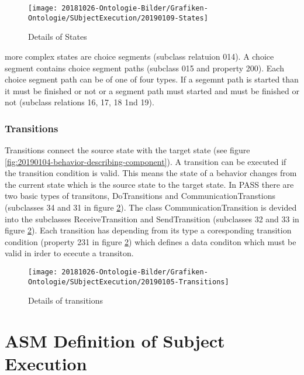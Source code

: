 \begin{figure}[ph]
	\centering
	\texttt{[image: 20181026-Ontologie-Bilder/Grafiken-Ontologie/SUbjectExecution/20190109-States]}
	\caption[Details of States]{Details of States}
	\label{fig:20190109-states}
\end{figure}

more complex states are choice segments (subclass relatuion 014). A choice segment contains choice segment paths (subclass 015 and property 200). Each choice segment path can be of one of four types. If a segemnt path is started than it must be finished or not or a segment path must started and must be finished or not (subclass relations 16, 17, 18 1nd 19).


\newpage

\subsubsection{Transitions}
Transitions connect the source state with the target state (see figure \ref{fig:20190104-behavior-describing-component}). A transition can be executed if the transition condition is valid. This means the state of a behavior changes from the current state which is the source state to the target state. In PASS there are two basic types of transitons, DoTransitions and CommunicationTranstions (subclasses 34 and 31 in figure \ref{fig:20190105-transitions}). The class CommunicationTransition is devided into the subclasses ReceiveTransition and SendTransition (subclasses 32 and 33 in figure \ref{fig:20190105-transitions}). Each transition has depending from its type a coresponding transition condition (property 231 in figure  \ref{fig:20190105-transitions}) which defines a data conditon which must be valid in irder to ececute a transiton.


\begin{figure}[ph]
	\centering
	\texttt{[image: 20181026-Ontologie-Bilder/Grafiken-Ontologie/SUbjectExecution/20190105-Transitions]}
	\caption[Details of transitions]{Details of transitions}
	\label{fig:20190105-transitions}
\end{figure}

\newpage




\section{ASM Definition of Subject Execution}

